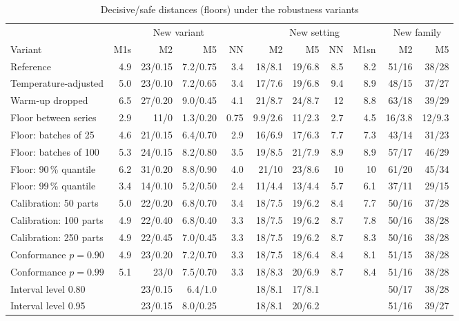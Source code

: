 \documentclass[pdflatex,sn-basic,lineno]{sn-jnl}
\newcommand{\tabsize}{\fontsize{8}{9.5}\selectfont}
\begin{document}
\begin{appendices}
\begin{table}[!ht]
\tabsize
\setlength{\tabcolsep}{1.6pt}
\caption{Decisive/safe distances (floors) under the robustness variants}\label{tab:robust}
\begin{tabular}{@{}lrrrrrrrrrr@{}}
\toprule
 & \multicolumn{4}{c}{New variant} & \multicolumn{4}{c}{New setting} & \multicolumn{2}{c}{New family} \\
\cmidrule(lr){2-5}\cmidrule(lr){6-9}\cmidrule(lr){10-11}
Variant & M1s & M2 & M5 & NN & M2 & M5 & NN & M1sn & M2 & M5 \\
\midrule
Reference & 4.9 & 23/0.15 & 7.2/0.75 & 3.4 & 18/8.1 & 19/6.8 & 8.5 & 8.2 & 51/16 & 38/28 \\
Temperature-adjusted & 5.0 & 23/0.10 & 7.2/0.65 & 3.4 & 17/7.6 & 19/6.8 & 9.4 & 8.9 & 48/15 & 37/27 \\
Warm-up dropped & 6.5 & 27/0.20 & 9.0/0.45 & 4.1 & 21/8.7 & 24/8.7 & 12 & 8.8 & 63/18 & 39/29 \\
Floor between series & 2.9 & 11/0 & 1.3/0.20 & 0.75 & 9.9/2.6 & 11/2.3 & 2.7 & 4.5 & 16/3.8 & 12/9.3 \\
Floor: batches of 25 & 4.6 & 21/0.15 & 6.4/0.70 & 2.9 & 16/6.9 & 17/6.3 & 7.7 & 7.3 & 43/14 & 31/23 \\
Floor: batches of 100 & 5.3 & 24/0.15 & 8.2/0.80 & 3.5 & 19/8.5 & 21/7.9 & 8.9 & 8.9 & 57/17 & 46/29 \\
Floor: 90\,\% quantile & 6.2 & 31/0.20 & 8.8/0.90 & 4.0 & 21/10 & 23/8.6 & 10 & 10 & 61/20 & 45/34 \\
Floor: 99\,\% quantile & 3.4 & 14/0.10 & 5.2/0.50 & 2.4 & 11/4.4 & 13/4.4 & 5.7 & 6.1 & 37/11 & 29/15 \\
Calibration: 50 parts & 5.0 & 22/0.20 & 6.8/0.70 & 3.4 & 18/7.5 & 19/6.2 & 8.4 & 7.7 & 50/16 & 37/28 \\
Calibration: 100 parts & 4.9 & 22/0.40 & 6.8/0.40 & 3.3 & 18/7.5 & 19/6.2 & 8.7 & 7.8 & 50/16 & 38/28 \\
Calibration: 250 parts & 4.9 & 22/0.45 & 7.0/0.45 & 3.3 & 18/7.5 & 19/6.2 & 8.7 & 8.3 & 50/16 & 38/28 \\
Conformance $p=0.90$ & 4.9 & 23/0.20 & 7.2/0.70 & 3.3 & 18/7.5 & 18/6.4 & 8.4 & 8.1 & 51/15 & 38/28 \\
Conformance $p=0.99$ & 5.1 & 23/0 & 7.5/0.70 & 3.3 & 18/8.3 & 20/6.9 & 8.7 & 8.4 & 51/16 & 38/28 \\
Interval level 0.80 &  & 23/0.15 & 6.4/1.0 &  & 18/8.1 & 17/8.1 &  &  & 50/17 & 38/28 \\
Interval level 0.95 &  & 23/0.15 & 8.0/0.25 &  & 18/8.1 & 20/6.2 &  &  & 51/16 & 39/27 \\

\end{tabular}
\end{table}
\end{appendices}
\end{document}
